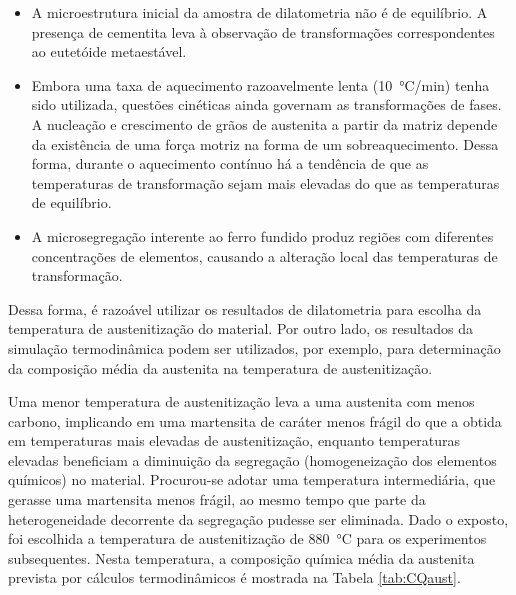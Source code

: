 \begin{itemize}
  \item A microestrutura inicial da amostra de dilatometria não é de equilíbrio. A presença de cementita leva à observação de transformações correspondentes ao eutetóide metaestável.
  \item Embora uma taxa de aquecimento razoavelmente lenta (\SI{10}{\degreeCelsius/min}) tenha sido utilizada, questões cinéticas ainda governam as transformações de fases. A nucleação e crescimento de grãos de austenita a partir da matriz depende da existência de uma força motriz na forma de um sobreaquecimento. Dessa forma, durante o aquecimento contínuo há a tendência de que as temperaturas de transformação sejam mais elevadas do que as temperaturas de equilíbrio. %
  \item A microsegregação interente ao ferro fundido produz regiões com diferentes concentrações de elementos, causando a alteração local das temperaturas de transformação.
\end{itemize}


Dessa forma, é razoável utilizar os resultados de dilatometria para escolha da temperatura de austenitização do material. Por outro lado, os resultados da simulação termodinâmica podem ser utilizados, por exemplo, para determinação da composição média da austenita na temperatura de austenitização.

Uma menor temperatura de austenitização leva a uma austenita com menos carbono, implicando em uma martensita de caráter menos frágil do que a obtida em temperaturas mais elevadas de austenitização, enquanto temperaturas elevadas beneficiam a diminuição da segregação (homogeneização dos elementos químicos) no material. Procurou-se adotar uma temperatura intermediária, que gerasse uma martensita menos frágil, ao mesmo tempo que parte da heterogeneidade decorrente da segregação pudesse ser eliminada. Dado o exposto, foi escolhida a temperatura de austenitização de \SI{880}{\degreeCelsius} para os experimentos subsequentes. Nesta temperatura, a composição química média da austenita prevista por cálculos termodinâmicos é mostrada na Tabela \ref{tab:CQaust}.

